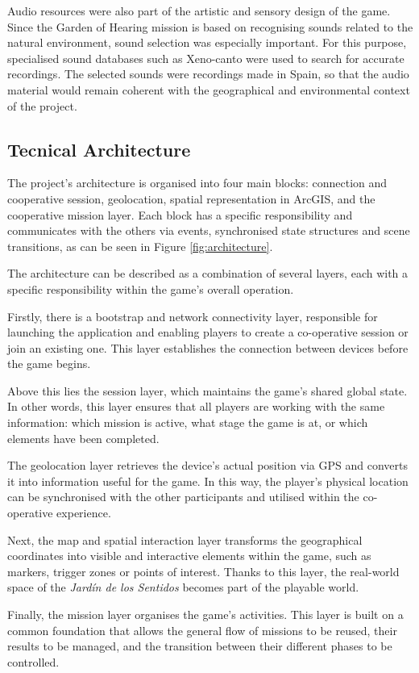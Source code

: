 Audio resources were also part of the artistic and sensory design of the game. Since the Garden of Hearing mission is based on recognising sounds related to the natural environment, sound selection was especially important. For this purpose, specialised sound databases such as Xeno-canto were used to search for accurate recordings. The selected sounds were recordings made in Spain, so that the audio material would remain coherent with the geographical and environmental context of the project.


\subsection{Tecnical Architecture}
The project’s architecture is organised into four main blocks: connection and cooperative session, geolocation, spatial representation in ArcGIS, and the cooperative mission layer. Each block has a specific responsibility and communicates with the others via events, synchronised state structures and scene transitions, as can be seen in Figure \ref{fig:architecture}.

The architecture can be described as a combination of several layers, each with a specific responsibility within the game’s overall operation.

Firstly, there is a bootstrap and network connectivity layer, responsible for launching the application and enabling players to create a co-operative session or join an existing one. This layer establishes the connection between devices before the game begins.

Above this lies the session layer, which maintains the game’s shared global state. In other words, this layer ensures that all players are working with the same information: which mission is active, what stage the game is at, or which elements have been completed.

The geolocation layer retrieves the device’s actual position via GPS and converts it into information useful for the game. In this way, the player’s physical location can be synchronised with the other participants and utilised within the co-operative experience.

Next, the map and spatial interaction layer transforms the geographical coordinates into visible and interactive elements within the game, such as markers, trigger zones or points of interest. Thanks to this layer, the real-world space of the \textit{Jardín de los Sentidos} becomes part of the playable world.

Finally, the mission layer organises the game’s activities. This layer is built on a common foundation that allows the general flow of missions to be reused, their results to be managed, and the transition between their different phases to be controlled.

